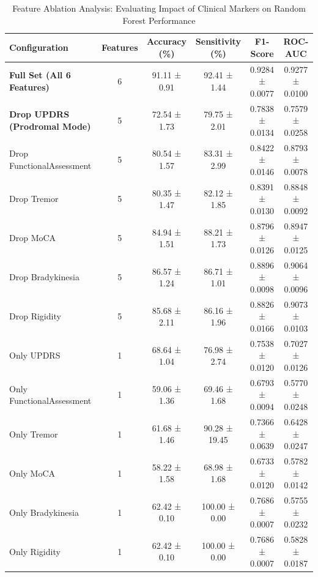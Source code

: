 \begin{table}[htbp]

\centering

\caption{Feature Ablation Analysis: Evaluating Impact of Clinical Markers on Random Forest Performance}

\label{tab:ablation}

\begin{tabular}{lccccc}

\hline

\textbf{Configuration} & \textbf{Features} & \textbf{Accuracy (\%)} & \textbf{Sensitivity (\%)} & \textbf{F1-Score} & \textbf{ROC-AUC} \\

\hline

\textbf{Full Set (All 6 Features)} & 6 & 91.11 ± 0.91 & 92.41 ± 1.44 & 0.9284 ± 0.0077 & 0.9277 ± 0.0100 \\

\textbf{Drop UPDRS (Prodromal Mode)} & 5 & 72.54 ± 1.73 & 79.75 ± 2.01 & 0.7838 ± 0.0134 & 0.7579 ± 0.0258 \\

Drop FunctionalAssessment & 5 & 80.54 ± 1.57 & 83.31 ± 2.99 & 0.8422 ± 0.0146 & 0.8793 ± 0.0078 \\

Drop Tremor & 5 & 80.35 ± 1.47 & 82.12 ± 1.85 & 0.8391 ± 0.0130 & 0.8848 ± 0.0092 \\

Drop MoCA & 5 & 84.94 ± 1.51 & 88.21 ± 1.73 & 0.8796 ± 0.0126 & 0.8947 ± 0.0125 \\

Drop Bradykinesia & 5 & 86.57 ± 1.24 & 86.71 ± 1.01 & 0.8896 ± 0.0098 & 0.9064 ± 0.0096 \\

Drop Rigidity & 5 & 85.68 ± 2.11 & 86.16 ± 1.96 & 0.8826 ± 0.0166 & 0.9073 ± 0.0103 \\

Only UPDRS & 1 & 68.64 ± 1.04 & 76.98 ± 2.74 & 0.7538 ± 0.0120 & 0.7027 ± 0.0126 \\

Only FunctionalAssessment & 1 & 59.06 ± 1.36 & 69.46 ± 1.68 & 0.6793 ± 0.0094 & 0.5770 ± 0.0248 \\

Only Tremor & 1 & 61.68 ± 1.46 & 90.28 ± 19.45 & 0.7366 ± 0.0639 & 0.6428 ± 0.0247 \\

Only MoCA & 1 & 58.22 ± 1.58 & 68.98 ± 1.68 & 0.6733 ± 0.0120 & 0.5782 ± 0.0142 \\

Only Bradykinesia & 1 & 62.42 ± 0.10 & 100.00 ± 0.00 & 0.7686 ± 0.0007 & 0.5755 ± 0.0232 \\

Only Rigidity & 1 & 62.42 ± 0.10 & 100.00 ± 0.00 & 0.7686 ± 0.0007 & 0.5828 ± 0.0187 \\

\hline

\end{tabular}

\end{table}

